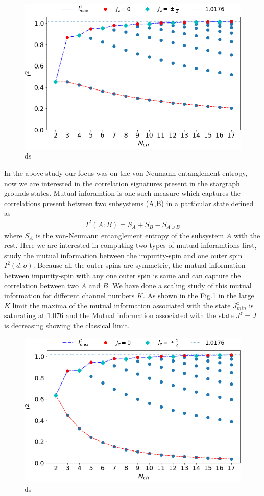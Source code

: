 \documentclass[reprint,prb,superscriptaddress]{revtex4-1}
\begin{document}
\begin{figure}[!h]
\includegraphics[scale=0.32]{plt/I_2_vs_Nch_0_1}
\caption{ds}
\label{fig:MI_d_o}
\end{figure}
\noindent In the above study our focus was on the von-Neumann entanglement entropy, now we are interested in the correlation signatures present in the stargraph grounds states. Mutual inforamtion is one such measure which captures the correlations present between two subsystems (A,B) in a particular state defined as
\begin{eqnarray}
I^2(A:B)=S_A+S_B-S_{A\cup B}
\end{eqnarray}
where $S_{A}$ is the von-Neumann entanglement entropy of the subsystem $A$ with the rest. Here we are interested in computing two types of mutual inforamtions first, study the mutual information between the impurity-spin and one outer spin $I^2(d:o)$. Because all the outer spins are symmetric, the mutual information between impurity-spin with any one outer spin is same and can capture the correlation between two $A$ and $B$. We have done a scaling study of this mutual information for different channel numbers $K$. As shown in the Fig.\ref{fig:MI_d_o} in the large $K$ limit the maxima of the mutual information associated with the state $J^z_{min}$ is saturating at $1.076$ and the Mutual information associated with the state $J^z=J$ is decreasing showing the classical limit.
\begin{figure}[!h]
\includegraphics[scale=0.32]{plt/I_2_vs_Nch_1_2}
\caption{ds}
\label{fig:MI_o_o}
\end{figure}
\end{document}
